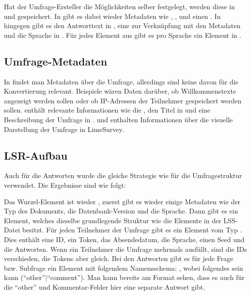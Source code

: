Hat der Umfrage-Ersteller die Möglichkeiten selber festgelegt, werden diese in  und  gespeichert.
In  gibt es dabei wieder Metadaten wie , , und einen .
In  hingegen gibt es den Antworttext in , eine  zur Verknüpfung mit den Metadaten und die Sprache in .
Für jedes Element aus  gibt es pro Sprache ein Element in .

\subsection{Umfrage-Metadaten}
\label{a:survey_meta}

In  findet man Metadaten über die Umfrage, allerdings sind keine davon für die Konvertierung relevant.
Beispiele wären Daten darüber, ob Willkommenstexte angezeigt werden sollen oder ob IP-Adressen der Teilnehmer gespeichert werden sollen.
 enthält relevante Informationen wie die , den Titel in  und eine Beschreibung der Umfrage in .
 und  enthalten Informationen über die visuelle Darstellung der Umfrage in LimeSurvey.

\subsection{LSR-Aufbau}

Auch für die Antworten wurde die gleiche Strategie wie für die Umfragestruktur verwendet.
Die Ergebnisse sind wie folgt:

Das Wurzel-Element ist wieder , zuerst gibt es wieder einige Metadaten wie der Typ des Dokuments, die Datenbank-Version und die Sprache.
Dann gibt es ein  Element, welches dieselbe grundlegende Struktur wie die Elemente in der LSS-Datei besitzt.
Für jeden Teilnehmer der Umfrage gibt es ein Element vom Typ .
Dies enthält eine ID, ein Token, das Absendedatum, die Sprache, einen Seed und die Antworten.
Wenn ein Teilnehmer die Umfrage mehrmals ausfüllt, sind die IDs verschieden, die Tokens aber gleich.
Bei den Antworten gibt es für jede Frage bzw. Subfrage ein Element mit folgendem Namensschema: 
, wobei  folgendes sein kann (\enquote{other}$\vert$\enquote{comment}).
Man kann bereits am Format sehen, dass es auch für die \enquote{other} und Kommentar-Felder hier eine separate Antwort gibt.

